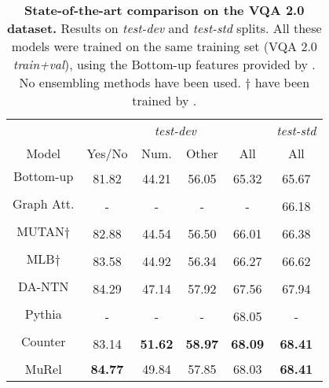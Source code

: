 \documentclass[10pt,twocolumn,letterpaper]{article}
\begin{document}
\begin{table}
    \centering
    \begin{tabular}{*5{c}c}
        \toprule
        & \multicolumn{4}{c}{\textit{test-dev}} & \textit{test-std}\\
        Model & Yes/No & Num. & Other & All & All  \\
        \midrule
        Bottom-up & \multirow{2}{*}{81.82} & \multirow{2}{*}{44.21} & \multirow{2}{*}{56.05} & \multirow{2}{*}{65.32} & \multirow{2}{*}{65.67} \\
        \cite{Anderson_2018_CVPR} \\
        Graph Att. & \multirow{2}{*}{-} & \multirow{2}{*}{-} & \multirow{2}{*}{-} & \multirow{2}{*}{-} & \multirow{2}{*}{66.18}\\
        \cite{learningconditionedgraph}\\
        MUTAN$\dagger$ & \multirow{2}{*}{82.88} & \multirow{2}{*}{44.54} & \multirow{2}{*}{56.50} & \multirow{2}{*}{66.01} & \multirow{2}{*}{66.38}\\
         \cite{benyounescadene2017mutan}  \\
        MLB$\dagger$ & \multirow{2}{*}{83.58} & \multirow{2}{*}{44.92} & \multirow{2}{*}{56.34} & \multirow{2}{*}{66.27} & \multirow{2}{*}{66.62}\\
        \cite{Kim2017} \\
        DA-NTN & \multirow{2}{*}{84.29} & \multirow{2}{*}{47.14} & \multirow{2}{*}{57.92} & \multirow{2}{*}{67.56} & \multirow{2}{*}{67.94}\\
        \cite{Bai_2018_ECCV} \\
        Pythia & \multirow{2}{*}{-} & \multirow{2}{*}{-} & \multirow{2}{*}{-} &  \multirow{2}{*}{68.05} & \multirow{2}{*}{-} \\
        \cite{pythia18arxiv}\\
        Counter & \multirow{2}{*}{83.14} & \multirow{2}{*}{\textbf{51.62}} & \multirow{2}{*}{\textbf{58.97}} & \multirow{2}{*}{\textbf{68.09}} & \multirow{2}{*}{\textbf{68.41}}\\
         \cite{zhang2018learning} \\
        \midrule
        MuRel & \textbf{84.77} & 49.84 & 57.85 & 68.03 & \textbf{68.41} \\ \bottomrule
    \end{tabular}
    \vspace{0.1cm}
    \caption{\label{tab:vqa2_sota} \textbf{State-of-the-art comparison on the VQA 2.0 dataset.} Results on \textit{test-dev} and \textit{test-std} splits. All these models were trained on the same training set (VQA 2.0 \textit{train+val}), using the Bottom-up features provided by \cite{Anderson_2018_CVPR}. No ensembling methods have been used. $\dagger$ have been trained by \cite{Bai_2018_ECCV}.}
\end{table}
\end{document}
